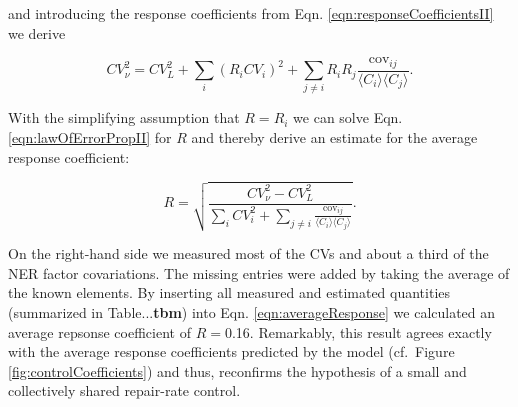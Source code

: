and introducing the response coefficients from Eqn. \ref{eqn:responseCoefficientsII} we derive

\begin{equation}
	CV_{\nu}^2 = CV_{L}^2 + \sum_{i}(R_iCV_i)^2 + \sum_{j\neq i} R_iR_j \frac{\textrm{cov}_{ij}}{\langle C_i \rangle\langle C_j\rangle}.
	\label{eqn:lawOfErrorPropII}
\end{equation}

With the simplifying assumption that $R = R_i$ we can solve Eqn. \ref{eqn:lawOfErrorPropII} for $R$ and thereby derive an estimate for the average response coefficient:

\begin{equation}
	R = \sqrt{	\frac{CV_{\nu}^2 - CV_L^2}{\sum_{i} CV_i^2 + \sum_{j\neq i} \frac{\textrm{cov}_{ij}}{\langle C_i \rangle\langle C_j\rangle}}}.
	\label{eqn:averageResponse}
\end{equation} 

On the right-hand side we measured most of the CVs and about a third of the NER factor covariations. The missing entries were added by taking the average of the known elements. By inserting all measured and estimated quantities (summarized in Table...\textbf{tbm}) into Eqn. \ref{eqn:averageResponse} we calculated an average repsonse coefficient of $R =$0.16. Remarkably, this result agrees exactly with the average response coefficients predicted by the model (cf.\ Figure \ref{fig:controlCoefficients}) and thus, reconfirms the hypothesis of a small and collectively shared repair-rate control.    




